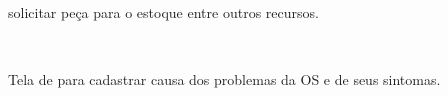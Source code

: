 solicitar peça para o estoque entre outros recursos.
\begin{figure}[htb]
	\centering
	\mbox{%
	}	
	
\end{figure}
\newpage
Tela de para cadastrar causa dos problemas da OS e de seus sintomas.
